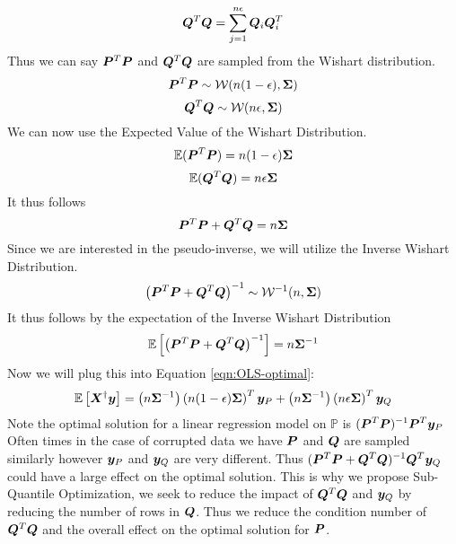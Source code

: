 \documentclass{article} %
\begin{document}
	\begin{equation}
		{\bm{Q}}^T{\bm{Q}} = \sum_{j=1}^{n{\epsilon}}{\bm{Q}}_i{\bm{Q}}_i^T
	\end{equation}\vspace{1em}
	Thus we can say ${\bm{P}}^T{\bm{P}}$ and ${\bm{Q}}^T{\bm{Q}}$ are sampled from the Wishart distribution.
	\begin{equation}
		{\bm{P}}^T{\bm{P}} \sim \mathcal{W}(n(1-{\epsilon}),{\bm{\Sigma}})
	\end{equation}
	\begin{equation}\vspace{1em}
		\mQ^T\mQ \sim \mathcal{W}(n\eps,\mSigma)
	\end{equation}
	We can now use the Expected Value of the Wishart Distribution.\vspace{1em}
	\begin{equation}
		\mathbb{E}({\bm{P}}^T{\bm{P}}) = n(1-{\epsilon}){\bm{\Sigma}}
	\end{equation}
	\begin{equation}\vspace{1em}
		\mathbb{E}(\mQ^T\mQ) = n\eps\mSigma
	\end{equation}
	It thus follows
	\begin{equation}\vspace{1em}
		\mP^T\mP + \mQ^T\mQ = n\mSigma
	\end{equation}
	Since we are interested in the pseudo-inverse, we will utilize the Inverse Wishart Distribution. 
	\begin{equation}
		\left({\bm{P}}^T{\bm{P}} + {\bm{Q}}^T{\bm{Q}}\right)^{-1} \sim \mathcal{W}^{-1}(n, {\bm{\Sigma}})
	\end{equation}
	It thus follows by the expectation of the Inverse Wishart Distribution 
	\begin{equation}
		\mathbb{E}\left[\left({\bm{P}}^T{\bm{P}} + {\bm{Q}}^T{\bm{Q}}\right)^{-1}\right] = n{\bm{\Sigma}}^{-1}
	\end{equation}
	Now we will plug this into Equation \ref{eqn:OLS-optimal}:\vspace{1em}
	\begin{equation}\vspace{1em}
		\mathbb{E}\left[\mX^{\dagger}\vy\right] = \left(n\mSigma^{-1}\right)\left(n(1-\eps)\mSigma\right)^T\vy_P + \left(n\mSigma^{-1}\right)\left(n\eps\mSigma\right)^T\vy_Q
	\end{equation}
	Note the optimal solution for a linear regression model on $\mathbb{P}$ is $\displaystyle ({\bm{P}}^T{\bm{P}})^{-1}{\bm{P}}^T {\bm{y}}_P$\\
	Often times in the case of corrupted data we have ${\bm{P}}$ and ${\bm{Q}}$ are sampled similarly however ${\bm{y}}_P$ and ${\bm{y}}_Q$ are very different. Thus $\displaystyle ({\bm{P}}^T{\bm{P}} + {\bm{Q}}^T{\bm{Q}})^{-1}{\bm{Q}}^T{\bm{y}}_Q$ could have a large effect on the optimal solution. This is why we propose Sub-Quantile Optimization, we seek to reduce the impact of ${\bm{Q}}^T{\bm{Q}}$ and ${\bm{y}}_Q$ by reducing the number of rows in ${\bm{Q}}$. Thus we reduce the condition number of ${\bm{Q}}^T {\bm{Q}}$ and the overall effect on the optimal solution for ${\bm{P}}$.
	
\end{document}
